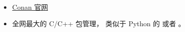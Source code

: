 
\begin{issues}
\issueDraft
\end{issues}

\begin{itemize}
\item \href{https://conan.io/center/}{Conan 官网}
\item 全网最大的 C/C++ 包管理， 类似于  Python 的  或者 。
\end{itemize}
